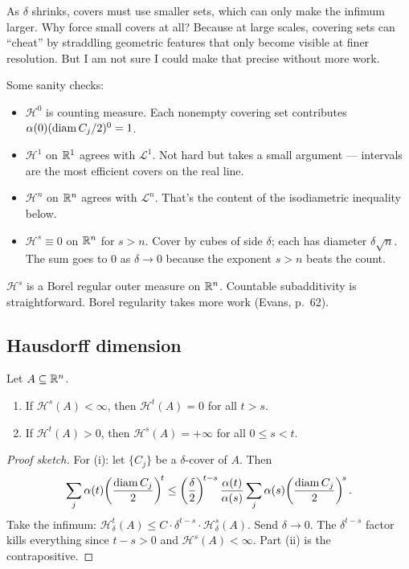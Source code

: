 As $\delta$ shrinks, covers must use smaller sets, which can
only make the infimum larger. Why force small covers at all? Because at large scales, covering sets can ``cheat'' by straddling geometric features that only become visible at finer resolution. But I am not sure I could make that precise without more work.

\begin{remark}\label{rem:hausdorff-sanity}
Some sanity checks:
\begin{itemize}[nosep]
  \item $\mathcal{H}^0$ is counting measure.
        Each nonempty covering set contributes
        $\alpha(0)(\operatorname{diam} C_j / 2)^0 = 1$.
  \item $\mathcal{H}^1$ on $\mathbb{R}^1$ agrees with $\mathcal{L}^1$.
        Not hard but takes a small argument --- intervals are the most
        efficient covers on the real line.
  \item $\mathcal{H}^n$ on $\mathbb{R}^n$ agrees with $\mathcal{L}^n$.
        That's the content of the isodiametric inequality below.
  \item $\mathcal{H}^s \equiv 0$ on $\mathbb{R}^n$ for $s > n$.
        Cover by cubes of side $\delta$; each has diameter
        $\delta\sqrt{n}$. The sum goes to $0$ as $\delta \to 0$ because
        the exponent $s > n$ beats the count.
\end{itemize}
\end{remark}

$\mathcal{H}^s$ is a Borel regular outer measure on $\mathbb{R}^n$. Countable
subadditivity is straightforward. Borel regularity takes more work
(Evans, p.\ 62).


\subsection{Hausdorff dimension}\label{subsec:hausdorff-dim}

\begin{lemma}\label{lem:dimension-threshold}
Let $A \subseteq \mathbb{R}^n$.
\begin{enumerate}[nosep]
  \item If $\mathcal{H}^s(A) < \infty$, then $\mathcal{H}^t(A) = 0$
        for all $t > s$.
  \item If $\mathcal{H}^t(A) > 0$, then $\mathcal{H}^s(A) = +\infty$
        for all $0 \le s < t$.
\end{enumerate}
\end{lemma}

\begin{proof}[Proof sketch]
For (i): let $\{C_j\}$ be a $\delta$-cover of $A$. Then
\[
  \sum_j \alpha(t)\!\left(\frac{\operatorname{diam} C_j}{2}\right)^{\!t}
  \le \left(\frac{\delta}{2}\right)^{\!t-s}
  \frac{\alpha(t)}{\alpha(s)}
  \sum_j \alpha(s)\!\left(\frac{\operatorname{diam} C_j}{2}\right)^{\!s}.
\]
Take the infimum: $\mathcal{H}^t_\delta(A) \le C \cdot \delta^{t-s}
\cdot \mathcal{H}^s_\delta(A)$. Send $\delta \to 0$. The
$\delta^{t-s}$ factor kills everything since $t - s > 0$ and
$\mathcal{H}^s(A) < \infty$. Part (ii) is the contrapositive. \qedhere
\end{proof}

